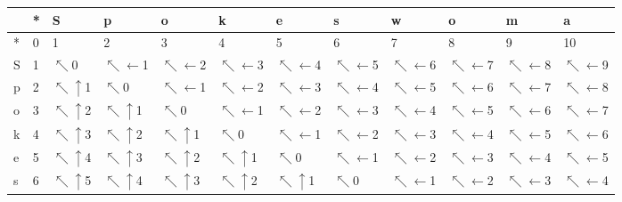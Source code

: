 \begin{tabular}{llllllllllll}
\toprule
{} &   * &                     S &                      p &                      o &                      k &                      e &                      s &                               w &                              o &                               m &                               a \\
\midrule
* &   0 &                     1 &                      2 &                      3 &                      4 &                      5 &                      6 &                               7 &                              8 &                               9 &                              10 \\
S &   1 &           $\nwarrow$0 &  $\nwarrow\leftarrow$1 &  $\nwarrow\leftarrow$2 &  $\nwarrow\leftarrow$3 &  $\nwarrow\leftarrow$4 &  $\nwarrow\leftarrow$5 &           $\nwarrow\leftarrow$6 &          $\nwarrow\leftarrow$7 &           $\nwarrow\leftarrow$8 &           $\nwarrow\leftarrow$9 \\
p &   2 &   $\nwarrow\uparrow$1 &            $\nwarrow$0 &  $\nwarrow\leftarrow$1 &  $\nwarrow\leftarrow$2 &  $\nwarrow\leftarrow$3 &  $\nwarrow\leftarrow$4 &           $\nwarrow\leftarrow$5 &          $\nwarrow\leftarrow$6 &           $\nwarrow\leftarrow$7 &           $\nwarrow\leftarrow$8 \\
o &   3 &   $\nwarrow\uparrow$2 &    $\nwarrow\uparrow$1 &            $\nwarrow$0 &  $\nwarrow\leftarrow$1 &  $\nwarrow\leftarrow$2 &  $\nwarrow\leftarrow$3 &           $\nwarrow\leftarrow$4 &          $\nwarrow\leftarrow$5 &           $\nwarrow\leftarrow$6 &           $\nwarrow\leftarrow$7 \\
k &   4 &   $\nwarrow\uparrow$3 &    $\nwarrow\uparrow$2 &    $\nwarrow\uparrow$1 &            $\nwarrow$0 &  $\nwarrow\leftarrow$1 &  $\nwarrow\leftarrow$2 &           $\nwarrow\leftarrow$3 &          $\nwarrow\leftarrow$4 &           $\nwarrow\leftarrow$5 &           $\nwarrow\leftarrow$6 \\
e &   5 &   $\nwarrow\uparrow$4 &    $\nwarrow\uparrow$3 &    $\nwarrow\uparrow$2 &    $\nwarrow\uparrow$1 &            $\nwarrow$0 &  $\nwarrow\leftarrow$1 &           $\nwarrow\leftarrow$2 &          $\nwarrow\leftarrow$3 &           $\nwarrow\leftarrow$4 &           $\nwarrow\leftarrow$5 \\
s &   6 &   $\nwarrow\uparrow$5 &    $\nwarrow\uparrow$4 &    $\nwarrow\uparrow$3 &    $\nwarrow\uparrow$2 &    $\nwarrow\uparrow$1 &            $\nwarrow$0 &           $\nwarrow\leftarrow$1 &          $\nwarrow\leftarrow$2 &           $\nwarrow\leftarrow$3 &           $\nwarrow\leftarrow$4 \\

\end{tabular}
